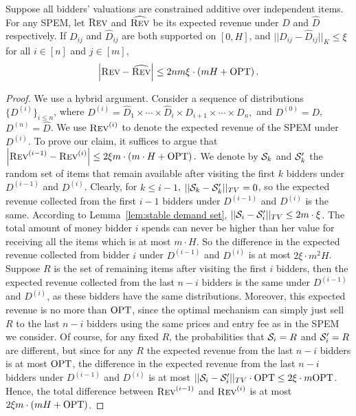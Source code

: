 \begin{theorem}\label{thm:revenue stability under K-distance}
	Suppose all bidders' valuations are constrained additive over independent items. For any SPEM, let $\textsc{Rev}$ and $\widehat{\textsc{Rev}}$ be its expected revenue under $D$ and $\hat{D}$ respectively. If $D_{ij}$ and $\hat{D}_{ij}$ are both supported on $[0,H]$, and $||D_{ij}-\hat{D}_{ij}||_K\leq \xi$ for all $i\in[n]$ and $j\in[m]$, $$\left|\textsc{Rev}-\widehat{\textsc{Rev}}\right|\leq 2nm\xi\cdot \left(mH+\text{OPT} \right).$$	
	\end{theorem}
\begin{proof}
	We use a hybrid argument. Consider a sequence of distributions $\{D^{(i)}\}_{i\leq n}$, where $D^{(i)}=\hat{D}_1\times\cdots\times\hat{D}_i\times D_{i+1}\times\cdots\times D_{n},$ and $D^{(0)}=D$, $D^{(n)}=\hat{D}$.
	 We use $\textsc{Rev}^{(i)}$ to denote the expected revenue of the SPEM under $D^{(i)}$. To prove our claim, it suffices to argue that $\left|\textsc{Rev}^{(i-1)} -\textsc{Rev}^{(i)}\right|\leq 2\xi m\cdot \left(m\cdot H+\text{OPT}\right).$
	  We denote by ${\mathcal{S}}_k$ and ${\mathcal{S}}'_k$ the random set of items that remain available after visiting the first $k$ bidders under $D^{(i-1)}$ and $D^{(i)}$. Clearly, for $k\leq i-1$, $||{\mathcal{S}}_k-{\mathcal{S}}'_k||_{TV}=0$, so the expected revenue collected from the first $i-1$ bidders under $D^{(i-1)}$ and $D^{(i)}$ is the same. According to Lemma~\ref{lem:stable demand set}, $||{\mathcal{S}}_i-{\mathcal{S}}'_i||_{TV}\leq 2m\cdot \xi$. The total amount of money bidder $i$ spends can never be higher than her value for receiving all the items which is at most $m\cdot H$. So the difference in the expected revenue collected from bidder $i$ under  $D^{(i-1)}$ and $D^{(i)}$ is at most $2\xi\cdot m^2H$. Suppose $R$ is the set of remaining items after visiting the first $i$ bidders, then the expected revenue collected from the last $n-i$ bidders is the same under  $D^{(i-1)}$ and $D^{(i)}$, as these bidders have the same distributions. Moreover, this expected revenue is no more than $\text{OPT}$, since the optimal mechanism can simply just sell $R$ to the last $n-i$ bidders using the same prices and entry fee as in the SPEM we consider. Of course, for any fixed $R$, the probabilities that ${\mathcal{S}}_i=R$ and ${\mathcal{S}}'_i=R$ are different, but since for any $R$ the expected revenue from the last $n-i$ bidders is at most $\text{OPT}$, the difference in the expected revenue from the last $n-i$ bidders under  $D^{(i-1)}$ and $D^{(i)}$ is at most $||{\mathcal{S}}_i-{\mathcal{S}}'_i||_{TV} \cdot \text{OPT} \leq 2\xi\cdot m\text{OPT}$. Hence, the total difference between $\textsc{Rev}^{(i-1)}$ and  $\textsc{Rev}^{(i)}$ is at most $2\xi m\cdot \left(m H+\text{OPT}\right)$. 
\end{proof}


